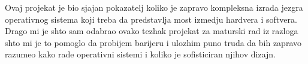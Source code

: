 \documentclass[a4paper,fleqn,12pt]{JMThesis}
\begin{document}
\newpage

Ovaj projekat je bio sjajan pokazatelj koliko je zapravo kompleksna izrada
jezgra operativnog sistema koji treba da predstavlja most izmedju hardvera i
softvera. Drago mi je shto sam odabrao ovako tezhak projekat za maturski rad iz
razloga shto mi je to pomoglo da probijem barijeru i ulozhim puno truda da bih
zapravo razumeo kako rade operativni sistemi i koliko je sofisticiran njihov
dizajn.

\thispagestyle{empty}
\mbox{}
\clearpage

\nocite{*}
\printbibliography[heading=bibintoc,title={Literatura}]
\end{document}

